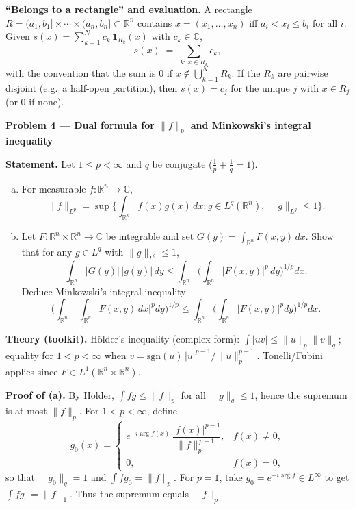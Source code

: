 \begin{problem}[CP-III-0010]
\par\smallskip\noindent\textbf{“Belongs to a rectangle” and evaluation.}\quad
A rectangle $R=(a_1,b_1]\times\cdots\times(a_n,b_n]\subset\mathbb R^n$
contains $x=(x_1,\dots,x_n)$ iff $a_i < x_i \le b_i$ for all $i$.
Given $s(x)=\sum_{k=1}^N c_k\,\mathbf 1_{R_k}(x)$ with $c_k\in\mathbb C$,
\[
s(x) \;=\; \sum_{k:\,x\in R_k} c_k,
\]
with the convention that the sum is $0$ if $x\notin\bigcup_{k=1}^N R_k$.
If the $R_k$ are pairwise disjoint (e.g.\ a half-open partition), then
$s(x)=c_j$ for the unique $j$ with $x\in R_j$ (or $0$ if none).

\par\medskip\noindent\textbf{Problem 4 — Dual formula for $\|f\|_{p}$ and Minkowski’s integral inequality}\quad


	\textbf{Statement.} Let $1\le p<\infty$ and $q$ be conjugate ($\tfrac1p+\tfrac1q=1$).
	\begin{enumerate}[(a)]
		\item For measurable $f:\mathbb R^{n}\to\mathbb C$,
		\[
		\|f\|_{L^{p}}
		= \sup\Big\{ \int_{\mathbb R^{n}} f(x)g(x)\,dx : g\in L^{q}(\mathbb R^{n}),\ \|g\|_{L^{q}}\le1 \Big\}.
		\]
		\item Let $F:\mathbb R^{n}\times\mathbb R^{n}\to\mathbb C$ be integrable and set
		$G(y)=\int_{\mathbb R^{n}} F(x,y)\,dx$.
		Show that for any $g\in L^{q}$ with $\|g\|_{L^{q}}\le1$,
		\[
		\int_{\mathbb R^{n}} |G(y)|\,|g(y)|\,dy
		\le \int_{\mathbb R^{n}} \Big(\int_{\mathbb R^{n}} |F(x,y)|^{p}\,dy\Big)^{1/p} dx.
		\]
		Deduce Minkowski’s integral inequality
		\[
		\Bigg(\int_{\mathbb R^{n}} \Big|\int_{\mathbb R^{n}} F(x,y)\,dx\Big|^{p} dy\Bigg)^{\!1/p}
		\le \int_{\mathbb R^{n}} \Big(\int_{\mathbb R^{n}} |F(x,y)|^{p} dy\Big)^{1/p} dx.
		\]
	\end{enumerate}


	\textbf{Theory (toolkit).}
	Hölder’s inequality (complex form):
	$\int |uv|\le \|u\|_{p}\|v\|_{q}$; equality for $1<p<\infty$ when $v=\mathrm{sgn}(u)\,|u|^{p-1}/\|u\|_{p}^{p-1}$.
	Tonelli/Fubini applies since $F\in L^{1}(\mathbb R^{n}\times\mathbb R^{n})$.


	\textbf{Proof of (a).}
	By Hölder, $\int f g \le \|f\|_{p}$ for all $\|g\|_{q}\le1$, hence the supremum is at most $\|f\|_{p}$.
	For $1<p<\infty$, define
	\[
	g_0(x)=
	\begin{cases}
		e^{-i\arg f(x)}\,\dfrac{|f(x)|^{p-1}}{\|f\|_{p}^{\,p-1}}, & f(x)\neq0,\\[8pt]
		0,& f(x)=0,
	\end{cases}
	\]
	so that $\|g_0\|_{q}=1$ and $\int f g_0=\|f\|_{p}$.
	For $p=1$, take $g_0=e^{-i\arg f}\in L^{\infty}$ to get $\int f g_0=\|f\|_{1}$.
	Thus the supremum equals $\|f\|_{p}$.


\end{problem}
